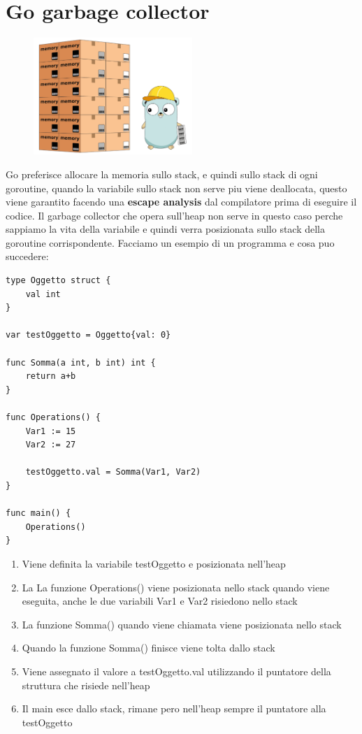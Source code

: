 \section{Go garbage collector}

\begin{figure}[h!]
    \centering
    \includegraphics[width=6cm]{sections/go-garbage-collector.png}
    \caption{}
    \label{fig:my_label}
\end{figure}

Go preferisce allocare la memoria sullo stack, e quindi sullo stack di ogni goroutine, quando la variabile sullo stack non serve piu viene deallocata, questo viene garantito facendo una \textbf{escape analysis} dal compilatore prima di eseguire il codice. \newline Il garbage collector che opera sull'heap non serve in questo caso perche sappiamo la vita della variabile e quindi verra posizionata sullo stack della goroutine corrispondente.  \newline
Facciamo un esempio di un programma e cosa puo succedere:
\newpage
\begin{lstlisting}
type Oggetto struct {
    val int
}

var testOggetto = Oggetto{val: 0}

func Somma(a int, b int) int {
    return a+b
}

func Operations() {
    Var1 := 15
    Var2 := 27
    
    testOggetto.val = Somma(Var1, Var2)
}

func main() {
    Operations()
}

\end{lstlisting}

\begin{enumerate}
    \item Viene definita la variabile testOggetto e posizionata nell'heap
    \item La La funzione Operations() viene posizionata nello stack quando viene eseguita, anche le due variabili Var1 e Var2 risiedono nello stack
    \item La funzione Somma() quando viene chiamata viene posizionata nello stack
    \item Quando la funzione Somma() finisce viene tolta dallo stack
    \item Viene assegnato il valore a testOggetto.val utilizzando il puntatore della struttura che risiede nell'heap
    \item Il main esce dallo stack, rimane pero nell'heap sempre il puntatore alla testOggetto
\end{enumerate}

